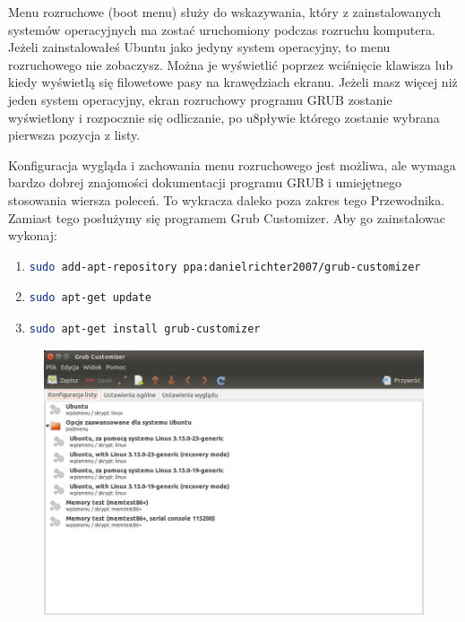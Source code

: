 Menu rozruchowe (boot menu) służy do wskazywania, który z zainstalowanych systemów operacyjnych ma zostać uruchomiony podczas rozruchu komputera. Jeżeli zainstalowałeś Ubuntu jako jedyny system operacyjny, to menu rozruchowego nie zobaczysz. Można je wyświetlić poprzez wciśnięcie klawisza  lub \keys{\arrowkeydown} kiedy wyświetlą się filowetowe pasy na krawędziach ekranu. Jeżeli masz więcej niż jeden system operacyjny, ekran rozruchowy programu GRUB zostanie wyświetlony i rozpocznie się odliczanie, po u8pływie którego zostanie wybrana pierwsza pozycja z listy.

Konfiguracja wygląda i zachowania menu rozruchowego jest możliwa, ale wymaga bardzo dobrej znajomości dokumentacji programu GRUB i umiejętnego stosowania wiersza poleceń. To wykracza daleko poza zakres tego Przewodnika. Zamiast tego posłużymy się programem \textcolor{ubuntu_orange}{Grub Customizer}. Aby go zainstalowac wykonaj:
\begin{enumerate}
\item
\begin{lstlisting}[language=bash]
sudo add-apt-repository ppa:danielrichter2007/grub-customizer
\end{lstlisting}
\item
\begin{lstlisting}[language=bash]
sudo apt-get update
\end{lstlisting}
\item
\begin{lstlisting}[language=bash]
sudo apt-get install grub-customizer
\end{lstlisting}
\end{enumerate}

\begin{figure}
	\vspace{-10pt}
	\includegraphics[width=\linewidth]{images/programy_grub_customizer.png}
\end{figure}

